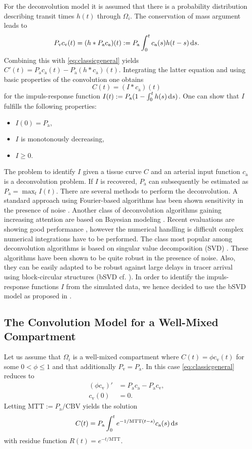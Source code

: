 \documentclass[paper=a4, fontsize=11pt,parskip=half,headings=small]{scrartcl}
\newcommand{\ca}{c_\mathrm{a}}
\newcommand{\CBV}{\mathrm{CBV}}
\newcommand{\MTT}{\mathrm{MTT}}
\newcommand{\cout}{c_{\mathrm{v}}}
\newcommand{\Pa}{P_{\mathrm{a}}}
\newcommand{\Pout}{P_{\mathrm{v}}}
\begin{document}
	For the deconvolution model it is assumed that there is a probability distribution describing transit times $h(t)$ through $\Omega_i$. 
	The conservation of mass argument leads to
	\[
		\Pout\cout(t) = (h*\Pa\ca)(t) := \Pa\int_0^t \ca(s) h(t-s) \diffint s.
	\]
	Combining this with \eqref{eq:classicgeneral} yields $C'(t) = \Pa\ca(t)-\Pa (h*\ca)(t)$.
	Integrating the latter equation and using basic properties of the convolution one obtains
	\begin{equation}
		C(t) = (I*\ca)(t)
		\label{eq:conv}
	\end{equation}
	for the impuls-response function $I(t) := \Pa(1-\int_0^t h(s) \diffint s)$.
	One can show that $I$ fulfills the following properties:
	\begin{itemize}
		\item $I(0) = \Pa$,
		\item $I$ is monotonously decreasing,
		\item $I\ge 0$.		
	\end{itemize}
	The problem to identify $I$ given a tissue curve $C$ and an arterial input function $\ca$ is a deconvolution problem.
	If $I$ is recovered, $\Pa$ can subsequently be estimated as $\Pa = \max_{t} I(t)$.
	There are several methods to perform the deconvolution.
	A standard approach using Fourier-based algorithms has been shown sensitivity in the presence of noise \cite{wirestam00,ostergaard96}.
	Another class of deconvolution algorithms gaining increasing attention are based on Bayesian modeling \cite{boutelier12,mouridsen06}.
	Recent evaluations are showing good performance \cite{sasaki13}, however the numerical handling is difficult complex numerical integrations have to be performed.
	The class most popular among deconvolution algorithms is based on singular value decomposition (SVD) \cite{ostergaard96}.
	These algorithms have been shown to be quite robust in the presence of noise.
	Also, they can be easily adapted to be robust against large delays in tracer arrival using block-circular structures (bSVD cf. \cite{wu03}).
	In order to identify the impuls-response functions $I$ from the simulated data, we hence decided to use the bSVD model as proposed in \cite{wu03}.

	\subsection{The Convolution Model for a Well-Mixed Compartment} \label{sec:comp}
	Let us assume that $\Omega_i$ is a well-mixed compartment where $C(t) = \phi\cout(t)$ for some $0 < \phi \le 1$ and that additionally $\Pout=\Pa$.
	In this case \eqref{eq:classicgeneral} reduces to
	\begin{align*}
		(\phi \cout)' &= \Pa \ca - \Pa \cout, \\
		\cout(0)&=0.
	\end{align*}
	Letting $\MTT:=\Pa/\CBV$ yields the solution
	\[
		C(t) = \Pa \int_0^t e^{-1/\MTT(t-s)}\ca(s)\diffint s
	\]
	with residue function $R(t)=e^{-t/\MTT}$. 
\end{document}
